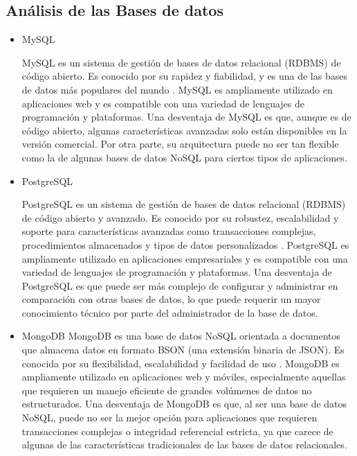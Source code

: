 \subsection{Análisis de las Bases de datos}
\begin{itemize}
    \item MySQL

    MySQL es un sistema de gestión de bases de datos relacional (RDBMS) de código abierto. Es conocido por su rapidez y fiabilidad, y es una de las bases de datos más 
    populares del mundo \cite{MySQL}. MySQL es ampliamente utilizado en aplicaciones web y es compatible con una variedad de lenguajes de programación y plataformas.
    Una desventaja de MySQL es que, aunque es de código abierto, algunas características avanzadas solo están disponibles en la versión comercial. Por otra parte, 
    su arquitectura puede no ser tan flexible como la de algunas bases de datos NoSQL para ciertos tipos de aplicaciones.
    
    \item PostgreSQL
    
    PostgreSQL es un sistema de gestión de bases de datos relacional (RDBMS) de código abierto y avanzado. Es conocido por su robustez, escalabilidad y soporte para 
    características avanzadas como transacciones complejas, procedimientos almacenados y tipos de datos personalizados \cite{PostgreSQL}. PostgreSQL es ampliamente 
    utilizado en aplicaciones empresariales y es compatible con una variedad de lenguajes de programación y plataformas. Una desventaja de PostgreSQL es que puede ser más 
    complejo de configurar y administrar en comparación con otras bases de datos, lo que puede requerir un mayor conocimiento técnico por parte del administrador de la 
    base de datos.
    
    \item MongoDB
    MongoDB es una base de datos NoSQL orientada a documentos que almacena datos en formato BSON (una extensión binaria de JSON). 
    Es conocida por su flexibilidad, escalabilidad y facilidad de uso \cite{MongoDB}. MongoDB es ampliamente utilizado en aplicaciones web y móviles, especialmente 
    aquellas que requieren un manejo eficiente de grandes volúmenes de datos no estructurados.
    Una desventaja de MongoDB es que, al ser una base de datos NoSQL, puede no ser la mejor opción para aplicaciones que requieren transacciones complejas o integridad 
    referencial estricta,
    ya que carece de algunas de las características tradicionales de las bases de datos relacionales.
\end{itemize}

